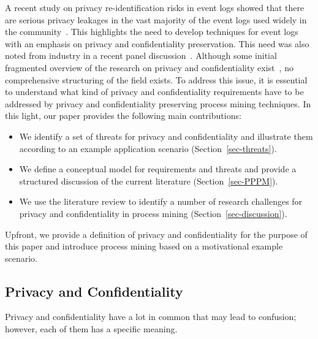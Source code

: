 \documentclass[manuscript]{acmart}
\begin{document}
A recent study on privacy re-identification risks in event logs showed that there are serious privacy leakages in the vast majority of the event logs used widely in the community~\cite{nunez2020quantifying}. This highlights the need to develop techniques for event logs with an emphasis on privacy and confidentiality preservation. This need was also noted from industry in a recent panel discussion~\cite{DBLP:journals/emisaij/MannhardtKBLTW20}. Although some initial fragmented overview of the research on privacy and confidentiality exist~\cite{mannhardt2018privacy,DBLP:conf/caise/Fahrenkrog-Petersen19}, no comprehensive structuring of the field exists. To address this issue, it is essential to understand what kind of privacy and confidentiality requirements have to be addressed by privacy and confidentiality preserving process mining techniques. 
In this light, our paper provides the following main contributions:
\begin{itemize}
    \item We identify a set of threats for privacy and confidentiality and illustrate them according to an example application scenario (Section~\ref{sec-threats}).
    \item We define a conceptual model for requirements and threats and provide a structured discussion of the current literature (Section~\ref{sec-PPPM}). 
    \item We use the literature review to identify a number of research challenges for privacy and confidentiality in process mining (Section~\ref{sec-discussion}). 
\end{itemize}

\noindent Upfront, we provide a definition of privacy and confidentiality for the purpose of this paper and introduce process mining based on a motivational example scenario.

\subsection{Privacy and Confidentiality}
\label{intro-privacy}

Privacy and confidentiality have a lot in common that may lead to confusion; however, each of them has a specific meaning.
\end{document}
